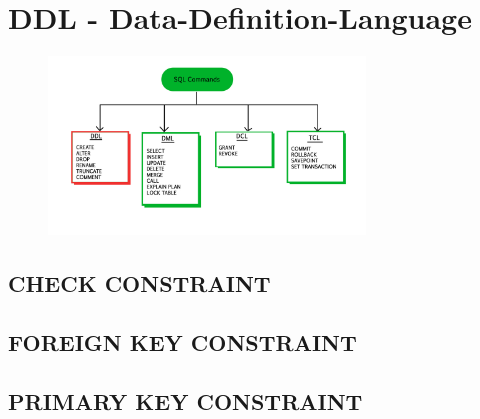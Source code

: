 \section[DDL]{DDL - Data-Definition-Language}
\label{sec:ddl}

\begin{figure}[h]
  \centering
  \includegraphics[width=0.75\textwidth]{img//sql-commands-ddl.jpg}
  \label{img:ddl}
\end{figure}

\subsection{CHECK CONSTRAINT}
\label{sec:ddl.check_constraint}

\subsection{FOREIGN KEY CONSTRAINT}
\label{sec:ddl.foreign_key_constraint}

\subsection{PRIMARY KEY CONSTRAINT}
\label{sec:ddl.primary_key_constraint}


